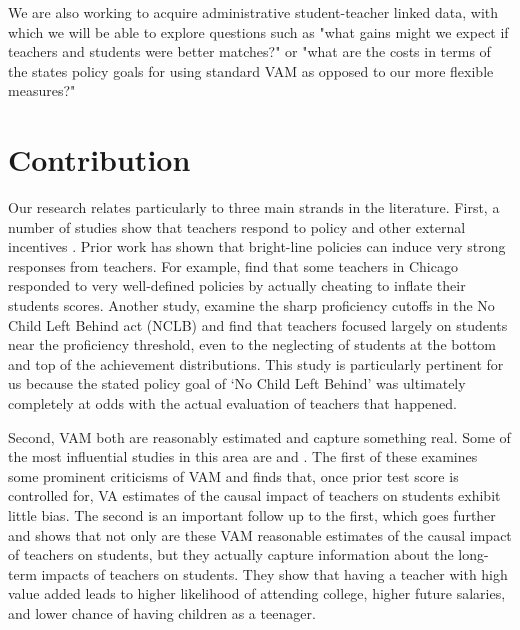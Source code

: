 \documentclass[letterpaper,12pt]{article}
\begin{document}
We are also working to acquire administrative student-teacher linked data, with which we will be able to explore questions such as "what gains might we expect if teachers and students were better matches?" or "what are the costs in terms of the states policy goals for using standard VAM as opposed to our more flexible measures?"





\section{Contribution}

Our research relates particularly to three main strands in the literature. First, a number of studies show that teachers respond to policy and other external incentives \cite{jacob2003rotten, neal2010left, pope2019effect}. Prior work has shown that bright-line policies can induce very strong responses from teachers. For example, \cite{jacob2003rotten} find that some teachers in Chicago responded to very well-defined policies by actually cheating to inflate their students scores. Another study, \cite{neal2010left} examine the sharp proficiency cutoffs in the No Child Left Behind act (NCLB) and find that teachers focused largely on students near the proficiency threshold, even to the neglecting of students at the bottom and top of the achievement distributions. This study is particularly pertinent for us because the stated policy goal of `No Child Left Behind' was ultimately completely at odds with the actual evaluation of teachers that happened.

Second, VAM both are reasonably estimated and capture something real. Some of the most influential studies in this area are \cite{chetty2014measuring1} and \cite{chetty2014measuring2}. The first of these examines some prominent criticisms of VAM and finds that, once prior test score is controlled for, VA estimates of the causal impact of teachers on students exhibit little bias. The second is an important follow up to the first, which goes further and shows that not only are these VAM reasonable estimates of the causal impact of teachers on students, but they actually capture information about the long-term impacts of teachers on students. They show that having a teacher with high value added leads to higher likelihood of attending college, higher future salaries, and lower chance of having children as a teenager.
\end{document}
